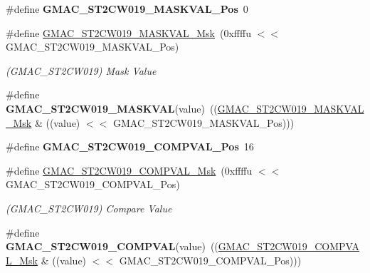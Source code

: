 \begin{DoxyCompactItemize}
\#define {\bfseries G\+M\+A\+C\+\_\+\+S\+T2\+C\+W019\+\_\+\+M\+A\+S\+K\+V\+A\+L\+\_\+\+Pos}~0
\item 
\mbox{\label{group__SAME70__GMAC_ga0c587d8cd5520758432feb65f7153368}} 
\#define \mbox{\hyperlink{group__SAME70__GMAC_ga0c587d8cd5520758432feb65f7153368}{G\+M\+A\+C\+\_\+\+S\+T2\+C\+W019\+\_\+\+M\+A\+S\+K\+V\+A\+L\+\_\+\+Msk}}~(0xffffu $<$$<$ G\+M\+A\+C\+\_\+\+S\+T2\+C\+W019\+\_\+\+M\+A\+S\+K\+V\+A\+L\+\_\+\+Pos)
\begin{DoxyCompactList}\small\item\em (G\+M\+A\+C\+\_\+\+S\+T2\+C\+W019) Mask Value \end{DoxyCompactList}\item 
\mbox{\label{group__SAME70__GMAC_ga9e7edb2225dccfef475c35acd255ffaa}} 
\#define {\bfseries G\+M\+A\+C\+\_\+\+S\+T2\+C\+W019\+\_\+\+M\+A\+S\+K\+V\+AL}(value)~((\mbox{\hyperlink{group__SAMV71__GMAC_ga0c587d8cd5520758432feb65f7153368}{G\+M\+A\+C\+\_\+\+S\+T2\+C\+W019\+\_\+\+M\+A\+S\+K\+V\+A\+L\+\_\+\+Msk}} \& ((value) $<$$<$ G\+M\+A\+C\+\_\+\+S\+T2\+C\+W019\+\_\+\+M\+A\+S\+K\+V\+A\+L\+\_\+\+Pos)))
\item 
\mbox{\label{group__SAME70__GMAC_ga8e3060fae26eff672ab1f18c3f7d0eef}} 
\#define {\bfseries G\+M\+A\+C\+\_\+\+S\+T2\+C\+W019\+\_\+\+C\+O\+M\+P\+V\+A\+L\+\_\+\+Pos}~16
\item 
\mbox{\label{group__SAME70__GMAC_gadcf30345a07dd061359226a80b5f44c0}} 
\#define \mbox{\hyperlink{group__SAME70__GMAC_gadcf30345a07dd061359226a80b5f44c0}{G\+M\+A\+C\+\_\+\+S\+T2\+C\+W019\+\_\+\+C\+O\+M\+P\+V\+A\+L\+\_\+\+Msk}}~(0xffffu $<$$<$ G\+M\+A\+C\+\_\+\+S\+T2\+C\+W019\+\_\+\+C\+O\+M\+P\+V\+A\+L\+\_\+\+Pos)
\begin{DoxyCompactList}\small\item\em (G\+M\+A\+C\+\_\+\+S\+T2\+C\+W019) Compare Value \end{DoxyCompactList}\item 
\mbox{\label{group__SAME70__GMAC_gaacbe7ca5a3f49b1b83ed8da2b7d8671a}} 
\#define {\bfseries G\+M\+A\+C\+\_\+\+S\+T2\+C\+W019\+\_\+\+C\+O\+M\+P\+V\+AL}(value)~((\mbox{\hyperlink{group__SAMV71__GMAC_gadcf30345a07dd061359226a80b5f44c0}{G\+M\+A\+C\+\_\+\+S\+T2\+C\+W019\+\_\+\+C\+O\+M\+P\+V\+A\+L\+\_\+\+Msk}} \& ((value) $<$$<$ G\+M\+A\+C\+\_\+\+S\+T2\+C\+W019\+\_\+\+C\+O\+M\+P\+V\+A\+L\+\_\+\+Pos)))

\end{DoxyCompactItemize}
